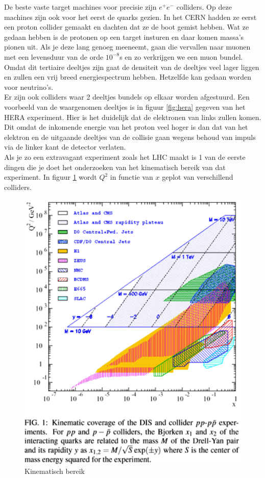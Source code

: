 \documentclass[../main.tex]{subfiles}
\begin{document}
De beste vaste target machines voor precisie zijn $e^+e^-$ colliders. Op deze machines zijn ook voor het eerst de quarks gezien. In het CERN hadden ze eerst een proton collider gemaakt en dachten dat ze de boot gemist hebben. Wat ze gedaan hebben is de protonen op een target insturen en daar komen massa's pionen uit. Als je deze lang genoeg meeneemt, gaan die vervallen naar muonen met een levensduur van de orde $10^{-8}$s en zo verkrijgen we een muon bundel. Omdat dit tertiaire deeltjes zijn gaat de densiteit van de deeltjes veel lager liggen en zullen een vrij breed energiespectrum hebben. Hetzelfde kan gedaan worden voor neutrino's.\\
Er zijn ook colliders waar 2 deeltjes bundels op elkaar worden afgestuurd. Een voorbeeld van de waargenomen deeltjes is in figuur \ref{fig:hera} gegeven van het HERA experiment. Hier is het duidelijk dat de elektronen van links zullen komen. Dit omdat de inkomende energie van het proton veel hoger is dan dat van het elektron en de uitgaande deeltjes van de collisie gaan wegens behoud van impuls via de linker kant de detector verlaten.\\
Als je zo een extravagant experiment zoals het LHC maakt is 1 van de eerste dingen die je doet het onderzoeken van het  kinematisch bereik van dat experiment. In figuur \ref{fig:kin_bereik} wordt $Q^2$ in functie van $x$ geplot van verschillend colliders.

\begin{figure}[h]
    \centering
    \includegraphics[width=0.8\linewidth]{DIS_nucleon_structuur_pdf/kin_bereik.png}
    \caption{Kinematisch bereik}%
    \label{fig:kin_bereik}
\end{figure}
\end{document}
